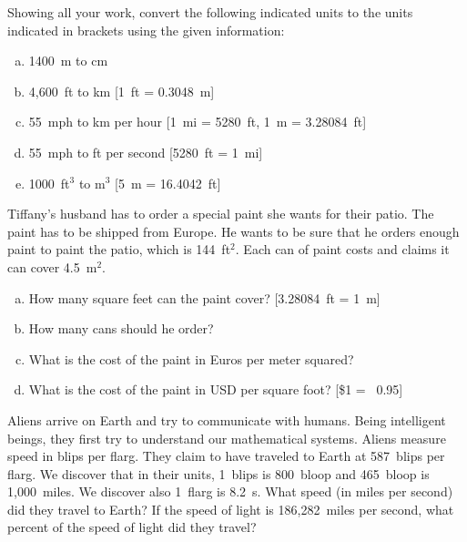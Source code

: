 \documentclass[11pt,letterpaper]{article}
\begin{document}

 Showing all your work, convert the following indicated units to the units indicated in brackets using the given information:
	\begin{enumerate}[(a)]
	\item 1400~m to cm
	\item 4,600~ft to km [1~ft = 0.3048~m]
	\item 55~mph to km per hour [1~mi = 5280~ft, 1~m = 3.28084~ft]
	\item 55~mph to ft per second [5280~ft = 1~mi]
	\item 1000~ft$^3$ to m$^3$ [5~m = 16.4042~ft]
	\end{enumerate}



\newpage



 Tiffany's husband has to order a special paint she wants for their patio. The paint has to be shipped from Europe. He wants to be sure that he orders enough paint to paint the patio, which is 144~ft$^2$. Each can of paint costs  and claims it can cover 4.5~m$^2$.
	\begin{enumerate}[(a)]
	\item How many square feet can the paint cover? [3.28084~ft = 1~m]
	\item How many cans should he order?
	\item What is the cost of the paint in Euros per meter squared?
	\item What is the cost of the paint in USD per square foot? [\$1 = \texteuro\ 0.95]
	\end{enumerate}



\newpage



 Aliens arrive on Earth and try to communicate with humans. Being intelligent beings, they first try to understand our mathematical systems. Aliens measure speed in blips per flarg. They claim to have traveled to Earth at 587~blips per flarg. We discover that in their units, 1~blips is 800~bloop and 465~bloop is 1,000~miles. We discover also 1~flarg is 8.2~s. What speed (in miles per second) did they travel to Earth? If the speed of light is 186,282~miles per second, what percent of the speed of light did they travel?
\end{document}
